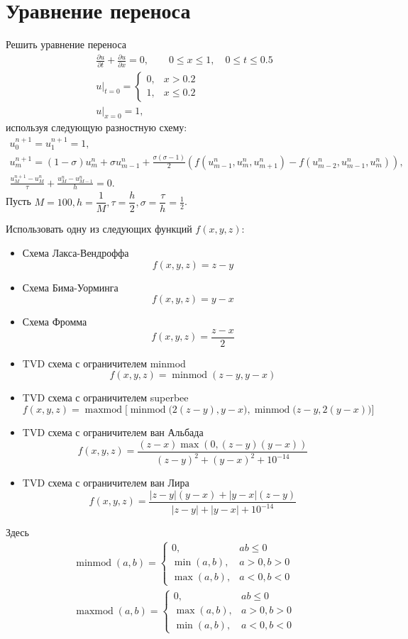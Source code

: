 \documentclass[10pt]{article}
\begin{document}
\newcommand{\pd}[2]{\frac{\partial #1}{\partial #2}}
\section{Уравнение переноса}

Решить уравнение переноса
\begin{gather*}
\pd{u}{t} + \pd{u}{x} = 0, \qquad 0 \leqslant x \leqslant 1, \quad 0 \leqslant t
\leqslant 0.5\\
u\big|_{t = 0} = 
\begin{cases}
0, &x > 0.2\\
1, &x \leqslant 0.2
\end{cases}\\
u\big|_{x = 0} = 1,
\end{gather*}
используя следующую разностную схему:
\begin{gather*}
u_0^{n+1} = u_1^{n+1} = 1,\\
u_{m}^{n+1} = (1 - \sigma)u_m^n + 
\sigma u_{m-1}^n + \frac{\sigma (\sigma - 1)}{2}
\left(
	f(u_{m-1}^n, u_{m}^n, u_{m+1}^n) -
	f(u_{m-2}^n, u_{m-1}^n, u_{m}^n)
\right),\\
\frac{u_M^{n+1} - u_M^n}{\tau} + 
\frac{u_M^n - u_{M-1}^n}{h} = 0.
\end{gather*}
Пусть $M = 100, h = \dfrac{1}{M}, \tau = \dfrac{h}{2}, \sigma = \dfrac{\tau}{h}
= \frac{1}{2}$.

\smallskip
Использовать одну из следующих функций $f(x, y, z)$:
\begin{itemize}
\item Схема Лакса-Вендроффа
\[
f(x, y, z) = z - y
\]
\item Схема Бима-Уорминга
\[
f(x, y, z) = y - x
\]
\item Схема Фромма
\[
f(x, y, z) = \frac{z - x}{2}
\]
\item TVD схема с ограничителем minmod
\[
f(x, y, z) = \operatorname{minmod}(z - y, y - x)
\]
\item TVD схема с ограничителем superbee
\[
f(x, y, z) = \operatorname{maxmod}
\Big[\operatorname{minmod}\big(2(z - y), y -
x\big),
\operatorname{minmod}\big(z - y, 2 (y - x)\big)
\Big]
\]
\item TVD схема с ограничителем ван Альбада
\[
f(x, y, z) = \frac{(z-x) \max(0, (z-y)(y-x))}{(z-y)^2 + (y-x)^2 + 10^{-14}}
\]
\item TVD схема с ограничителем ван Лира
\[
f(x, y, z) = \frac{|z-y|(y-x) + |y-x|(z-y)}{|z-y| + |y-x| + 10^{-14}}
\]
\end{itemize}
Здесь
\begin{gather*}
\operatorname{minmod}(a,b) = 
\begin{cases}
0, &ab\leqslant 0\\\min(a,b), &a>0, b>0\\\max(a,b), &a<0, b<0
\end{cases}\\
\operatorname{maxmod}(a,b) = 
\begin{cases}
0, &ab\leqslant 0\\\max(a,b), &a>0, b>0\\\min(a,b), &a<0, b<0
\end{cases}
\end{gather*}
\end{document}
